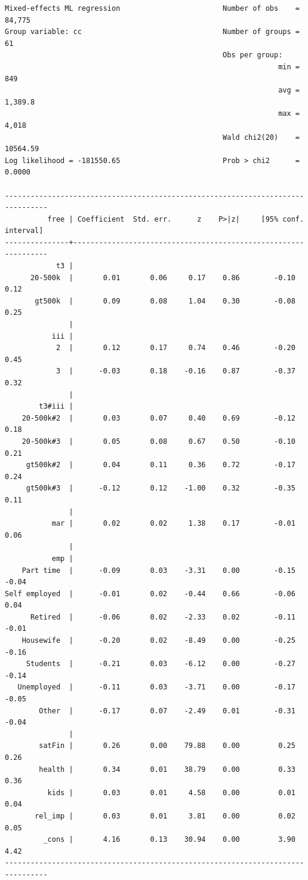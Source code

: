 \documentclass[10pt, letterpaper]{article}
\begin{document}
\begin{spacing}{1.4}
\begin{scriptsize}
\begin{spacing}{.19}
\begin{verbatim}
Mixed-effects ML regression                        Number of obs    =   84,775
Group variable: cc                                 Number of groups =       61
                                                   Obs per group:
                                                                min =      849
                                                                avg =  1,389.8
                                                                max =    4,018
                                                   Wald chi2(20)    = 10564.59
Log likelihood = -181550.65                        Prob > chi2      =   0.0000

--------------------------------------------------------------------------------
          free | Coefficient  Std. err.      z    P>|z|     [95% conf. interval]
---------------+----------------------------------------------------------------
            t3 |
      20-500k  |       0.01       0.06     0.17    0.86        -0.10        0.12
       gt500k  |       0.09       0.08     1.04    0.30        -0.08        0.25
               |
           iii |
            2  |       0.12       0.17     0.74    0.46        -0.20        0.45
            3  |      -0.03       0.18    -0.16    0.87        -0.37        0.32
               |
        t3#iii |
    20-500k#2  |       0.03       0.07     0.40    0.69        -0.12        0.18
    20-500k#3  |       0.05       0.08     0.67    0.50        -0.10        0.21
     gt500k#2  |       0.04       0.11     0.36    0.72        -0.17        0.24
     gt500k#3  |      -0.12       0.12    -1.00    0.32        -0.35        0.11
               |
           mar |       0.02       0.02     1.38    0.17        -0.01        0.06
               |
           emp |
    Part time  |      -0.09       0.03    -3.31    0.00        -0.15       -0.04
Self employed  |      -0.01       0.02    -0.44    0.66        -0.06        0.04
      Retired  |      -0.06       0.02    -2.33    0.02        -0.11       -0.01
    Housewife  |      -0.20       0.02    -8.49    0.00        -0.25       -0.16
     Students  |      -0.21       0.03    -6.12    0.00        -0.27       -0.14
   Unemployed  |      -0.11       0.03    -3.71    0.00        -0.17       -0.05
        Other  |      -0.17       0.07    -2.49    0.01        -0.31       -0.04
               |
        satFin |       0.26       0.00    79.88    0.00         0.25        0.26
        health |       0.34       0.01    38.79    0.00         0.33        0.36
          kids |       0.03       0.01     4.58    0.00         0.01        0.04
       rel_imp |       0.03       0.01     3.81    0.00         0.02        0.05
         _cons |       4.16       0.13    30.94    0.00         3.90        4.42
--------------------------------------------------------------------------------


\end{verbatim}
\end{spacing}
\end{scriptsize}
\end{spacing}
\end{document}
